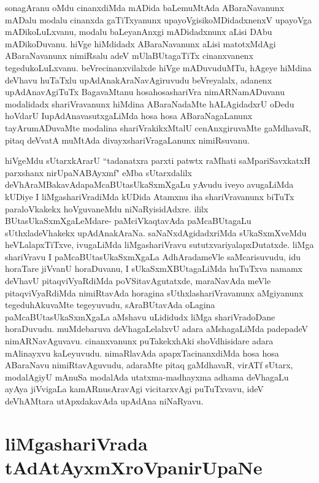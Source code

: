 
\begin{artha}
sonagAranu oMdu cinanxdiMda mADida baLemuMtAda ABaraNavanunx mADalu modalu cinanxda gaTiTxyanunx upayoVgisi\-\break koMDidadxnenxV upayoVga mADikoLuLxvanu, modalu baLeyanAnxgi mADidadxnunx aLisi DAbu mADikoDuvanu. hiVge hiMdidadx ABaraNavanunx aLisi matotxMdAgi ABaraNavanunx nimiRsalu adeV mUlaBUtagaTiTx cinanxvanenx tegedukoLuLxvanu. beVrecinanxvilalxde hiVge mADuvuduMTu, hAgeye hiMdina deVhavu huTaTxlu upAdAnakAraNavAgiruvudu beVreyalalx, adanenx upAdAnavAgiTuTx BagavaMtanu hosahosashariVra nimARNamADuvanu modalidadx shariVravanunx hiMdina ABaraNadaMte hALAgidadxrU oDedu hoVdarU I\break upAdAnavasutxgaLiMda hosa hosa ABaraNagaLanunx tayAru\break mADuvaMte modalina shariVrakikxMtalU cenAnxgiruvaMte gaMdhavaR, pitaq deVvatA muMtAda divayxshariVragaLanunx nimiRsuvanu. 

hiVgeMdu sUtarxkArarU ``tadanatxra parxti patwtx raMhati saMpariSavxkatxH parxshanx nirUpaNABAyxmf" eMba sUtarxdalilx deVhAraMBakavAda\break paMcaBUtasUkaSxmXgaLu yAvudu iveyo avugaLiMda kUDiye I liMgashariVradiMda kUDida Atamxnu iha shariVravanunx biTuTx paraloVkakekx hoVguvaneMdu niNaRyisidAdxre. ililx BUtasUkaSxmX\-\break gaLeMdare- paMciVkaqtavAda paMcaBUtagaLu sUthxladeVhakekx upAdAnakAraNa. saNaNxdAgidadxriMda sUkaSxmXveMdu heVLalapxTiTxve, ivugaLiMda liMgashariVravu sututxvariyalapxDutatxde. liMga shariVravu I paMcaBUtasUkaSxmXgaLa AdhAradameVle saMcarisuvudu, idu horaTare jiVvanU horaDuvanu, I sUkaSxmXBUtagaLiMda huTuTxva namamx deVhavU pitaqviVyaRdiMda poVSitavAgutatxde, maraNavAda meVle pitaqviVyaRdiMda nimiRtavAda horagina sUthxlashariVravanunx aMgiyanunx tegeduhAkuvaMte tegeyuvudu, sAraBUtavAda oLagina paMcaBUtasUkaSxmXgaLa aMshavu uLididudx liMga shariVradoDane horaDuvudu. muMdebaruva deVhagaLelalxvU adara aMshagaLiMda padepadeV nimARNavAguvavu. cinanxvanunx puTakekxhAki shoVdhisidare adara mAlinayxvu kaLeyuvudu. nimaRlavAda apapxTacinanxdiMda hosa hosa ABaraNavu nimiRtavAguvudu, adaraMte pitaq gaMdhavaR, virATf sUtarx, modalAgiyU mAnuSa modalAda utatxma-madhayxma adhama deVhagaLu ayAya jiVvigaLa kamARnusAravAgi vicitarxvAgi puTuTxvavu, ideV deVhAMtara utApxdakavAda upAdAna niNaRyavu.
\end{artha}

\section*{liMgashariVrada tAdAtAyxmXroVpanirUpaNe}

